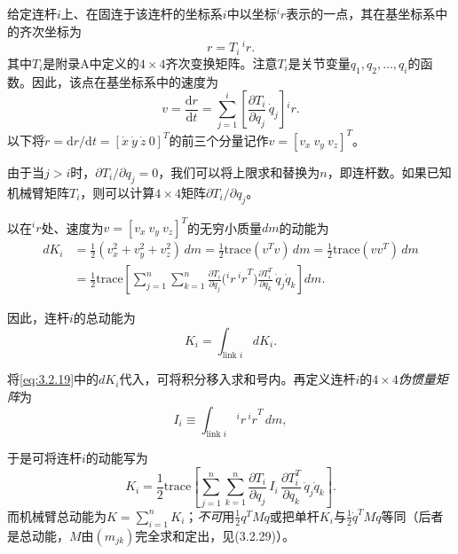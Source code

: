 \documentclass[12pt,a4paper]{ctexart}
\begin{document}
给定连杆$i$上、在固连于该连杆的坐标系$i$中以坐标${^ir}$表示的一点，其在基坐标系中的齐次坐标为
\begin{equation}\label{eq:3.2.17}
r = T_i\,{^ir}.
\end{equation}
其中$T_i$是附录A中定义的$4\times4$齐次变换矩阵。注意$T_i$是关节变量$q_1, q_2, \ldots, q_i$的函数。因此，该点在基坐标系中的速度为
\begin{equation}\label{eq:3.2.18}
v = \frac{\mathrm{d}r}{\mathrm{d}t} = \sum_{j=1}^{i} \left[ \frac{\partial T_i}{\partial q_j}\,\dot{q}_j \right] {^ir}.
\end{equation}
以下将$\dot{r}=\mathrm{d}r/\mathrm{d}t=[\dot{x}\ \dot{y}\ \dot{z}\ 0]^T$的前三个分量记作$v=[v_x\ v_y\ v_z]^T$。

由于当$j > i$时，$\partial T_i/\partial q_j = 0$，我们可以将上限求和替换为$n$，即连杆数。如果已知机械臂矩阵$T_i$，则可以计算$4 \times 4$矩阵$\partial T_i/\partial q_j$。

以在${^ir}$处、速度为$v=[v_x\ v_y\ v_z]^T$的无穷小质量$dm$的动能为
\begin{equation}\label{eq:3.2.19}
\begin{aligned}
dK_i &= \frac{1}{2}(v_x^2+v_y^2+v_z^2)\,dm = \frac{1}{2}\text{trace}(v^{T}v)\,dm = \frac{1}{2}\text{trace}(vv^{T})\,dm \\
&= \frac{1}{2}\text{trace}\!\left[\sum_{j=1}^{n}\sum_{k=1}^{n} \frac{\partial T_i}{\partial q_j}\bigl({^ir}\,{^ir}^{T}\bigr)\frac{\partial T_i^{T}}{\partial q_k}\,\dot{q}_j\dot{q}_k\right]dm.
\end{aligned}
\end{equation}

因此，连杆$i$的总动能为
\begin{equation*}
K_i = \int_{\text{link }i} dK_i.
\end{equation*}

将\eqref{eq:3.2.19}中的$dK_i$代入，可将积分移入求和号内。再定义连杆$i$的$4\times4$\emph{伪惯量矩阵}为
\begin{equation}\label{eq:3.2.20}
I_i \equiv \int_{\text{link }i}{^ir}\,{^ir}^{T}\,dm,
\end{equation}

于是可将连杆$i$的动能写为
\begin{equation}\label{eq:3.2.21}
K_i = \frac{1}{2}\text{trace}\left[\sum_{j=1}^{n}\sum_{k=1}^{n} \frac{\partial T_i}{\partial q_j}\,I_i\,\frac{\partial T_i^{T}}{\partial q_k}\,\dot{q}_j\dot{q}_k\right].
\end{equation}
而机械臂总动能为$K = \sum_{i=1}^{n}K_i$；\emph{不可}用$\frac{1}{2}q^{T}M\dot{q}$或把单杆$K_i$与$\frac{1}{2}\dot{q}^{T}M\dot{q}$等同（后者是总动能，$M$由$(m_{jk})$完全求和定出，见(3.2.29)）。
\end{document}
